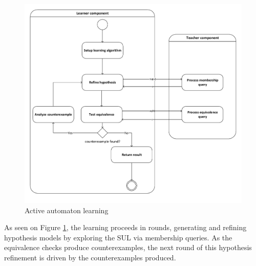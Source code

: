 \begin{figure}[H]
	\centering
	\includegraphics[width=1.0\linewidth]{figures/flowchartlearning}
	\caption{Active automaton learning}
	\label{fig:flowchartlearning}
\end{figure}

As seen on Figure \ref{fig:flowchartlearning}, the learning proceeds in rounds, generating and refining hypothesis models by exploring the SUL via membership queries. As the equivalence checks produce counterexamples, the next round of this hypothesis refinement is driven by the counterexamples produced.

